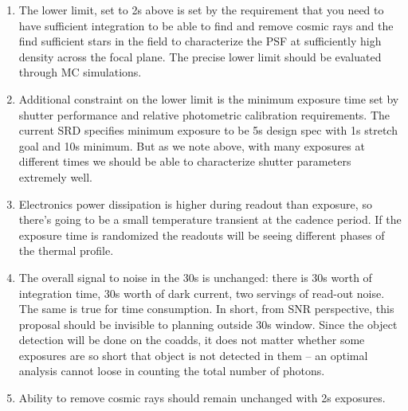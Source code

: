 \documentclass[12pt, a4paper]{article}
\begin{document}
\begin{enumerate}


\item The lower limit, set to 2s above is set by the requirement that
  you need to have sufficient integration to be able to find and
  remove cosmic rays and the find sufficient stars in the field to
  characterize the PSF at sufficiently high density across the focal
  plane. The precise lower limit should be evaluated through MC
  simulations.

\item Additional constraint on the lower limit is the minimum exposure
  time set by shutter performance and relative photometric calibration
  requirements. The current SRD specifies minimum exposure to be 5s
  design spec with 1s stretch goal and 10s minimum. But as we note
  above, with many exposures at different times we should be able to
  characterize shutter parameters extremely well.



\item Electronics power dissipation is higher during readout than
  exposure, so there's going to be a small temperature transient at
  the cadence period. If the exposure time is randomized the readouts
  will be seeing different phases of the thermal profile.

\item The overall signal to noise in the 30s is unchanged: there is
  30s worth of integration time, 30s worth of dark current, two
  servings of read-out noise. The same is true for time
  consumption. In short, from SNR perspective, this proposal should be
  invisible to planning outside 30s window. Since the object detection
  will be done on the coadds, it does not matter whether some
  exposures are so short that object is not detected in them -- an
  optimal analysis cannot loose in counting the total number of photons.

\item Ability to remove cosmic rays should remain unchanged with 2s exposures.
\end{enumerate}
\end{document}
